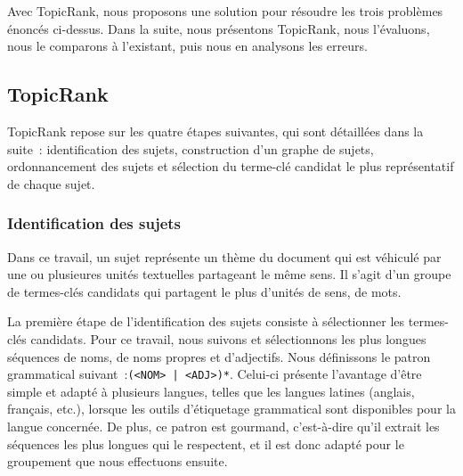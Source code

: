     Avec TopicRank, nous proposons une solution pour résoudre les trois
    problèmes énoncés ci-dessus. Dans la suite, nous présentons TopicRank, nous
    l'évaluons, nous le comparons à l'existant, puis nous en analysons les
    erreurs.

    \subsection{TopicRank}
    \label{subsec:main-automatic_keyphrase_annotation-unsupervised_automatic_keyphrase_extraction-topicrank}
      TopicRank repose sur les quatre étapes suivantes, qui sont détaillées dans
      la suite~: identification des sujets, construction d'un graphe de sujets,
      ordonnancement des sujets et sélection du terme-clé candidat le plus
      représentatif de chaque sujet.

      \subsubsection{Identification des sujets}
      \label{subsubsec:main-automatic_keyphrase_annotation-unsupervised_automatic_keyphrase_extraction-topicrank-topic_identification}
        Dans ce travail, un sujet représente un thème du document qui est
        véhiculé par une ou plusieures unités textuelles partageant le même
        sens. Il s'agit d'un groupe de termes-clés candidats qui partagent le
        plus d'unités de sens, de mots.

        La première étape de l'identification des sujets consiste à sélectionner
        les termes-clés candidats.
        Pour ce travail, nous suivons  et
        sélectionnons les plus longues séquences de noms, de noms propres et
        d'adjectifs. Nous définissons le patron grammatical
        suivant~:\texttt{(<NOM> | <ADJ>)*}. Celui-ci présente l'avantage d'être simple
        et adapté à plusieurs langues, telles que les langues latines (anglais, français, etc.), lorsque les
        outils d'étiquetage grammatical sont disponibles pour la langue
        concernée. De plus, ce patron est gourmand, c'est-à-dire qu'il extrait
        les séquences les plus longues qui le respectent, et il est donc adapté
        pour le groupement que nous effectuons ensuite.

